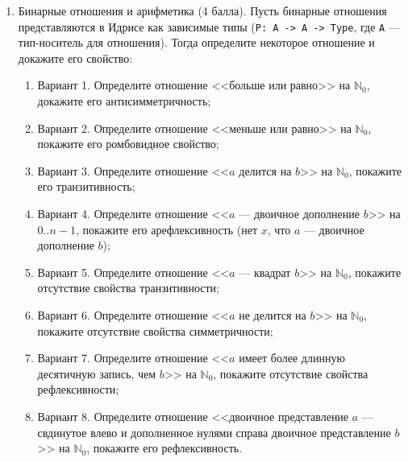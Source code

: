 \documentclass[10pt,a4paper,oneside]{article}
\begin{document}
\begin{enumerate}
\item Бинарные отношения и арифметика (4 балла).
Пусть бинарные отношения представляются в Идрисе как зависимые типы (\verb!P: A -> A -> Type!,
где \verb!A! --- тип-носитель для отношения).
Тогда определите некоторое отношение и докажите его свойство:
\begin{enumerate}
\item Вариант 1.
Определите отношение <<больше или равно>> на $\mathbb{N}_0$, докажите его антисимметричность;
\item Вариант 2.
Определите отношение <<меньше или равно>> на $\mathbb{N}_0$, покажите его ромбовидное свойство;
\item Вариант 3.
Определите отношение <<$a$ делится на $b$>> на $\mathbb{N}_0$, покажите его транзитивность;
\item Вариант 4.
Определите отношение <<$a$ --- двоичное дополнение $b$>> на $0..n-1$, покажите его арефлексивность (нет $x$, что $a$ ---
двоичное дополнение $b$);
\item Вариант 5.
Определите отношение <<$a$ --- квадрат $b$>> на $\mathbb{N}_0$, покажите отсутствие свойства транзитивности;
\item Вариант 6.
Определите отношение <<$a$ не делится на $b$>> на $\mathbb{N}_0$, покажите отсутствие свойства симметричности;
\item Вариант 7.
Определите отношение <<$a$ имеет более длинную десятичную запись, чем $b$>> на $\mathbb{N}_0$, покажите отсутствие свойства рефлексивности;
\item Вариант 8.
Определите отношение <<двоичное представление $a$ --- свдинутое влево и дополненное нулями справа двоичное представление $b$>> 
на $\mathbb{N}_0$, покажите его рефлексивность.
\end{enumerate}

\end{enumerate}
\end{document}
